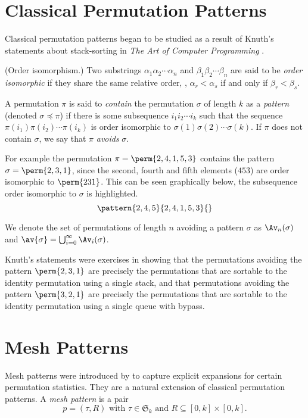 \section{Classical Permutation Patterns}
Classical permutation patterns began to be studied as a result of Knuth's
statements about stack-sorting in \emph{The Art of Computer Programming}
\cite[p.~243, Ex.~5,6]{Knuth:1997:ACP:260999}.

\begin{definition}{(Order isomorphism.)}
    Two substrings \(\alpha_1\alpha_2\dotsm\alpha_n\) and
    \(\beta_1\beta_2\dotsm\beta_n\) are said to be \emph{order isomorphic}
    if they share the same relative order, \ie, \(\alpha_r<\alpha_s\) if and
    only if \(\beta_r<\beta_s\).
\end{definition}

A permutation \(\pi\) is said to \emph{contain} the permutation \(\sigma\) of
length \(k\) as a \emph{pattern} (denoted \(\sigma \preceq \pi\)) if there is some
subsequence \(i_1i_2\dotsm{}i_k\) such that the sequence
\(\pi(i_1)\pi(i_2)\dotsm\pi(i_k)\) is order isomorphic to
\(\sigma(1)\sigma(2)\dotsm\sigma(k)\). If \(\pi\) does not contain
\(\sigma\), we say that \(\pi\) \emph{avoids} \(\sigma\).

For example the permutation \(\pi = \perm{2,4,1,5,3}\) contains the pattern
\(\sigma = \perm{2,3,1}\), since the second, fourth and fifth elements
(\(453\)) are order isomorphic to \(\perm{231}\).
This can be seen graphically below, the subsequence order isomorphic to \(\sigma\)
is highlighted.
\begin{equation*}
    \pattern{2,4,5}{2,4,1,5,3}{}
\end{equation*}

We denote the set of permutations of length \(n\) avoiding a pattern \(\sigma\)
as \(\Av_n(\sigma)\) and \(\av{\sigma} = \bigcup_{i=0}^{\infty}\Av_i(\sigma)\).

Knuth's statements were exercises in showing that the permutations avoiding the
pattern \(\perm{2,3,1}\) are precisely the permutations that are sortable to
the identity permutation using a single stack, and that permutations avoiding the
pattern \(\perm{3,2,1}\) are precisely the permutations that are sortable to
the identity permutation using a single queue with bypass.

\section{Mesh Patterns}
Mesh patterns were introduced by \textcite{journals/combinatorics/BrandenC11} to
capture explicit expansions for certain permutation statistics. They are a
natural extension of classical permutation patterns.
A \emph{mesh pattern} is a pair
\begin{equation*}
    p = (\tau,R)\text{ with } \tau \in \mathfrak{S}_k \text{ and } R \subseteq
    [0,k]\times [0,k].
\end{equation*}


